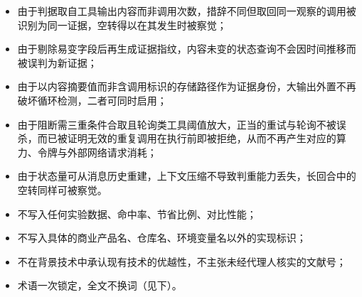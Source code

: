 \documentclass[11pt,UTF8]{ctexart}
\begin{document}

\begin{itemize}
  \item 由于判据取自工具输出内容而非调用次数，措辞不同但取回同一观察的调用被识别为同一证据，空转得以在其发生时被察觉；
  \item 由于剔除易变字段后再生成证据指纹，内容未变的状态查询不会因时间推移而被误判为新证据；
  \item 由于以内容摘要值而非含调用标识的存储路径作为证据身份，大输出外置不再破坏循环检测，二者可同时启用；
  \item 由于阻断需三重条件合取且轮询类工具阈值放大，正当的重试与轮询不被误杀，而已被证明无效的重复调用在执行前即被拒绝，从而不再产生对应的算力、令牌与外部网络请求消耗；
  \item 由于状态量可从消息历史重建，上下文压缩不导致判重能力丢失，长回合中的空转同样可被察觉。
\end{itemize}


\begin{itemize}
  \item 不写入任何实验数据、命中率、节省比例、对比性能；
  \item 不写入具体的商业产品名、仓库名、环境变量名以外的实现标识；
  \item 不在背景技术中承认现有技术的优越性，不主张未经代理人核实的文献号；
  \item 术语一次锁定，全文不换词（见下）。
\end{itemize}

\end{document}

